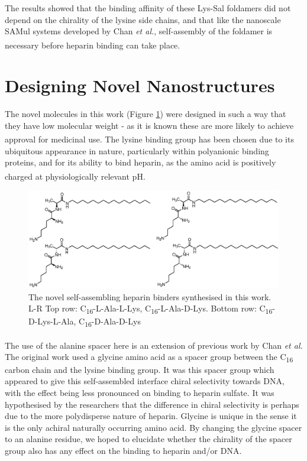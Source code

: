 The results showed that the binding affinity of these Lys-Sal foldamers did not depend on the chirality of the lysine side chains, and that like the nanoscale SAMul systems developed by Chan \textit{et al.}, self-assembly of the foldamer is necessary before heparin binding can take place.\textsuperscript{\cite{Chan2016ChiralBinding,Montalvo2014DeInteractions}}

\section{Designing Novel Nanostructures}
The novel molecules in this work (Figure \ref{C16-Ala-Lys_family})
were designed in such a way that they have low molecular weight - as it is known these are more likely to achieve approval for medicinal use.\textsuperscript{\cite{Bromfield2013HeparinApplications}}
The lysine binding group has been chosen due to its ubiquitous appearance in nature, particularly within polyanionic binding proteins, and for its ability to bind heparin, as the amino acid is positively charged at physiologically relevant pH.\textsuperscript{\cite{Bromfield2015HeparinNanostructures}}
\begin{figure} [h!]
\centering
\includegraphics[scale=0.9]{Figures/C16-Ala-Lys_family.eps}
\caption{ The novel self-assembling heparin binders synthesised in this work. \newline
L-R Top row: C\textsubscript{16}-L-Ala-L-Lys, C\textsubscript{16}-L-Ala-D-Lys. Bottom row: C\textsubscript{16}-D-Lys-L-Ala, C\textsubscript{16}-D-Ala-D-Lys}
\label{C16-Ala-Lys_family}
\end{figure}

The use of the alanine spacer here is an extension of previous work by Chan \textit{et al.}\textsuperscript{\cite{Chan2016ChiralBinding}} The original work used a glycine amino acid as a spacer group between the C\textsubscript{16} carbon chain and the lysine binding group. It was this spacer group which appeared to give this self-assembled interface chiral selectivity towards DNA, with the effect being less pronounced on binding to heparin sulfate. It was hypothesised by the researchers that the difference in chiral selectivity is perhaps due to the more polydisperse nature of heparin. Glycine is unique in the sense it is the only achiral naturally occurring amino acid. By changing the glycine spacer to an alanine residue, we hoped to elucidate whether the chirality of the spacer group also has any effect on the binding to heparin and/or DNA. 

